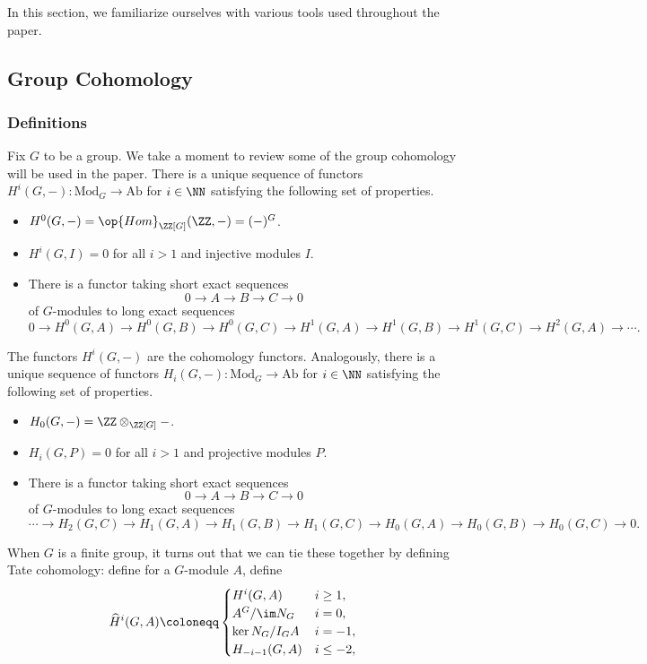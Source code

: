 
In this section, we familiarize ourselves with various tools used throughout the paper.

\subsection{Group Cohomology}

\subsubsection{Definitions}
Fix $G$ to be a group. We take a moment to review some of the group cohomology will be used in the paper. There is a unique sequence of functors $H^i(G,-)\colon\mathrm{Mod}_G\to\mathrm{Ab}$ for $i\in\NN$ satisfying the following set of properties.
\begin{itemize}
	\item $H^0(G,-)=\op{Hom}_{\ZZ[G]}(\ZZ,-)=(-)^G$.
	\item $H^i(G,I)=0$ for all $i>1$ and injective modules $I$.
	\item There is a functor taking short exact sequences
	\[0\to A\to B\to C\to 0\]
	of $G$-modules to long exact sequences
	\[0\to H^0(G,A)\to H^0(G,B)\to H^0(G,C)\to H^1(G,A)\to H^1(G,B)\to H^1(G,C)\to H^2(G,A)\to\cdots.\]
\end{itemize}
The functors $H^i(G,-)$ are the cohomology functors. Analogously, there is a unique sequence of functors $H_i(G,-)\colon\mathrm{Mod}_G\to\mathrm{Ab}$ for $i\in\NN$ satisfying the following set of properties.
\begin{itemize}
	\item $H_0(G,-)=\ZZ\otimes_{\ZZ[G]}-$.
	\item $H_i(G,P)=0$ for all $i>1$ and projective modules $P$.
	\item There is a functor taking short exact sequences
	\[0\to A\to B\to C\to 0\]
	of $G$-modules to long exact sequences
	\[\cdots\to H_2(G,C)\to H_1(G,A)\to H_1(G,B)\to H_1(G,C)\to H_0(G,A)\to H_0(G,B)\to H_0(G,C)\to0.\]
\end{itemize}
When $G$ is a finite group, it turns out that we can tie these together by defining Tate cohomology: define for a $G$-module $A$, define
\[\widehat H^i(G,A)\coloneqq\begin{cases}
	H^i(G,A) & i\ge1, \\
	A^G/\im N_G & i=0, \\
	\ker N_G/I_GA & i=-1, \\
	H_{-i-1}(G,A) & i\le-2,
\end{cases}\]
